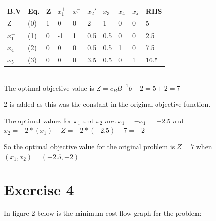 \documentclass{article}
\begin{document}
\vspace{5mm}
\begin{tabular}{|l|l|l|l l l l l l|l|}
  \hline
  B.V           & Eq. & Z & $x_1^+$& $x_1^-$& $x_2'$ & $x_3$ & $x_4$ & $x_5$ & RHS \\ \hline
  Z             & (0) & 1 & 0  & 0  & 2  & 1  & 0  & 0  & 5 \\ \hline
  $x_1^-$       & (1) & 0 & -1 & 1  & 0.5& 0.5& 0  & 0  & 2.5 \\ \hline
  $x_4$         & (2) & 0 & 0  & 0  & 0.5& 0.5& 1  & 0  & 7.5  \\ \hline
  $x_5$         & (3) & 0 & 0  & 0  & 3.5& 0.5& 0  & 1  & 16.5  \\ \hline
\end{tabular}
\vspace{5mm}
\\

The optimal objective value is $Z=c_BB^{-1}b+2=5+2=7$

2 is added as this was the constant in the original objective function.

\vspace{5mm}
The optimal values for $x_1$ and $x_2$ are:
$x_1=-x_1^-=-2.5$ and $x_2=-2*(x_1)-Z=-2*(-2.5)-7=-2$

So the optimal objective value for the original problem is $Z=7$ when $(x_1,x_2)=(-2.5,-2)$




\pagebreak

\section{Exercise 4} %

In figure 2 below is the minimum cost flow graph for the problem:
\end{document}
